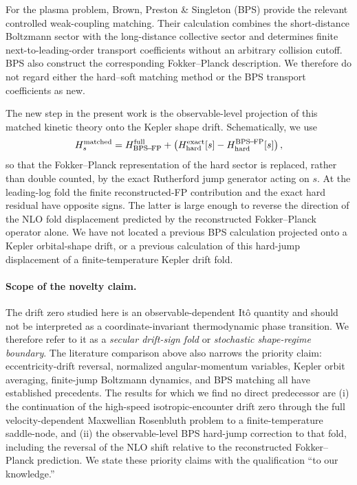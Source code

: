 \documentclass[11pt]{article}
\theoremstyle{remark}
\newcommand{\1}{\mathbf 1}
\begin{document}
For the plasma problem, Brown, Preston \& Singleton (BPS) \cite{BPS2005} provide the
relevant controlled weak-coupling matching.  Their calculation combines the
short-distance Boltzmann sector with the long-distance collective sector and
determines finite next-to-leading-order transport coefficients without an
arbitrary collision cutoff.  BPS also construct the corresponding
Fokker--Planck description.  We therefore do not regard either the
hard--soft matching method or the BPS transport coefficients as new.

The new step in the present work is the observable-level projection of this
matched kinetic theory onto the Kepler shape drift.  Schematically, we use
\[
H_s^{\rm matched}
=
H_{\rm BPS\!-\!FP}^{\rm full}
+
\left(
H_{\rm hard}^{\rm exact}[s]
-
H_{\rm hard}^{\rm BPS\!-\!FP}[s]
\right),
\]
so that the Fokker--Planck representation of the hard sector is replaced,
rather than double counted, by the exact Rutherford jump generator acting on
$s$.  At the leading-log fold the finite reconstructed-FP contribution and
the exact hard residual have opposite signs.  The latter is large enough to
reverse the direction of the NLO fold displacement predicted by the
reconstructed Fokker--Planck operator alone.  We have not located a previous
BPS calculation projected onto a Kepler orbital-shape drift, or a previous
calculation of this hard-jump displacement of a finite-temperature Kepler
drift fold.

\paragraph{Scope of the novelty claim.}
The drift zero studied here is an observable-dependent It\^o quantity and
should not be interpreted as a coordinate-invariant thermodynamic phase
transition.  We therefore refer to it as a \emph{secular drift-sign fold} or
\emph{stochastic shape-regime boundary}.  The literature comparison above
also narrows the priority claim: eccentricity-drift reversal, normalized
angular-momentum variables, Kepler orbit averaging, finite-jump Boltzmann
dynamics, and BPS matching all have established precedents.  The results for
which we find no direct predecessor are (i) the continuation of the
high-speed isotropic-encounter drift zero through the full
velocity-dependent Maxwellian Rosenbluth problem to a finite-temperature
saddle-node, and (ii) the observable-level BPS hard-jump correction to that
fold, including the reversal of the NLO shift relative to the reconstructed
Fokker--Planck prediction.  We state these priority claims with the
qualification ``to our knowledge.''
\end{document}
